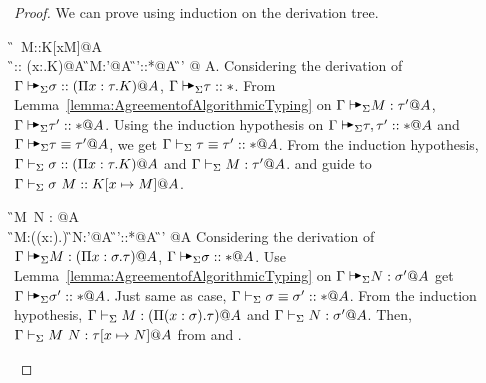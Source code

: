 \begin{proof}
    We can prove using induction on the derivation tree.
    \begin{rneqncase}{\KAApp{}}{
            \G\AVS \sigma\ M::K[x\mapsto M]@A \\
            \G\AVS \sigma:: (\Pi x:\tau.K)@A \text{ , }
            \G\AVS M:\tau'@A \text{ , } 
            \G\AVS\tau'::*@A  
            \G\AVS \tau \E \tau' @ A.
        }
        Considering the derivation of \( \G\AVS \sigma:: (\Pi x:\tau.K)@A \),
        \( \G \AVS \tau::* \). From
        Lemma~\ref{lemma:AgreementofAlgorithmicTyping} on \( \G\AVS M:\tau'@A
        \), \( \G \AVS \tau' :: * @ A \). Using the induction hypothesis on \(
        \G \AVS \tau, \tau'::* @ A \) and \( \G\AVS \tau \E \tau' @ A \), we
        get \( \Gamma\vdash_\Sigma \tau \equiv \tau' :: * @ A \). From the induction hypothesis,
        \( \Gamma\vdash_\Sigma \sigma:: (\Pi x:\tau.K)@A \) and \( \Gamma\vdash_\Sigma M:\tau'@A \). \TConv
        and \KApp guide to \( \Gamma\vdash_\Sigma \sigma\ M::K[x\mapsto M]@A \).
    \end{rneqncase}
    \begin{rneqncase}{\TAApp}{
            \G\AVS M\ N : \tau[x\mapsto N]@A \\
            \G\AVS M:(\Pi (x:\sigma).\tau) \text{ , }
            \G\AVS N:\sigma'@A \text{ , }
            \G\AVS \sigma'::*@A 
            \G\AVS \sigma\E\sigma' @A
        }
        Considering the derivation of \( \G\AVS M: (\Pi x:\sigma.\tau)@A \), \(
        \G \AVS \sigma :: * @ A \). Use
        Lemma~\ref{lemma:AgreementofAlgorithmicTyping} on \( \G\AVS N:\sigma'@A
        \) get \( \G \AVS \sigma' :: * @ A \).  Just same as \KApp case, \(
        \Gamma\vdash_\Sigma \sigma\equiv\sigma' :: * @A \).  From the induction hypothesis, \(
        \Gamma\vdash_\Sigma M:(\Pi (x:\sigma).\tau) @ A\) and \( \Gamma\vdash_\Sigma N:\sigma'@A \). Then, \(
        \Gamma\vdash_\Sigma M\ N : \tau[x\mapsto N]@A \) from \TConv and \TApp.
    \end{rneqncase}
\end{proof}
